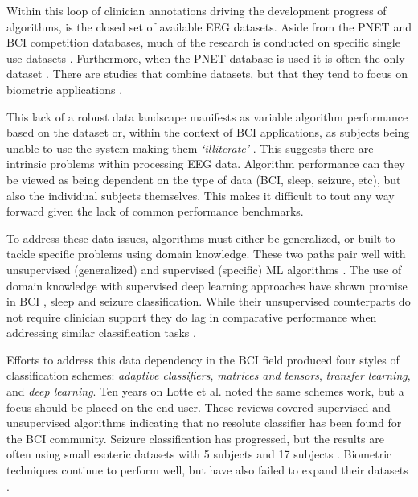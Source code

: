Within this loop of clinician annotations driving the development progress of algorithms, is the closed set of available \ac{EEG} datasets. Aside from the \ac{PNET} \cite{Goldberger2000} and \ac{BCI} competition \cite{Blankertz2006a} databases, much of the research is conducted on specific single use datasets \cite{Wulsin2011,Subasi2010,Radha2014}. Furthermore, when the \ac{PNET} database is used it is often the only dataset \cite{Yang2016,Marcel2007a,Fraschini2015,Rodrigues2016}. There are studies that combine datasets, but that they tend to focus on biometric applications \cite{Delpozo-Banos2015}.

This lack of a robust data landscape manifests as variable algorithm performance based on the dataset\cite{Lawhern2016,Lotte2007b} or, within the context of \ac{BCI} applications, as subjects being unable to use the system making them \textit{`illiterate'} \cite{Vidaurre2010a,Spezialetti2018}. This suggests there are intrinsic problems within processing \ac{EEG} data. Algorithm performance can they be viewed as being dependent on the type of data (\ac{BCI}, sleep, seizure, etc), but also the individual subjects themselves. This makes it difficult to tout any way forward given the lack of common performance benchmarks.

To address these data issues, algorithms must either be generalized, or built to tackle specific problems using domain knowledge. These two paths pair well with unsupervised (generalized) and supervised (specific) \ac{ML} algorithms \cite{Makeig2012,Martinez-del-Rincon2017,Blanco2010,Lotte2018}. The use of domain knowledge with supervised deep learning approaches have shown promise in \ac{BCI} \cite{Tabar2017}, sleep \cite{Aboalayon2014} and seizure \cite{Wulsin2011,Chu2017} classification. While their unsupervised counterparts do not require clinician support they do lag in comparative performance when addressing similar classification tasks \cite{Vidaurre2011,Lu2009a,Kasabov2013,Lotte2018}.

Efforts to address this data dependency in the \ac{BCI} field produced four styles of classification schemes: \emph{adaptive classifiers}, \emph{matrices and tensors}, \emph{transfer learning}, and \emph{deep learning}\cite{Lotte2007b}. Ten years on Lotte et al. \cite{Lotte2018} noted the same schemes work, but a focus should be placed on the end user. These reviews covered supervised and unsupervised algorithms indicating that no resolute classifier has been found for the \ac{BCI} community. Seizure classification has progressed, but the results are often using small esoteric datasets with 5 subjects \cite{Acharya2018} and 17 subjects \cite{Chu2017}. Biometric techniques continue to perform well, but have also failed to expand their datasets \cite{Abdullah2010,DelPozo-Banos2014a,Yang2016}.


